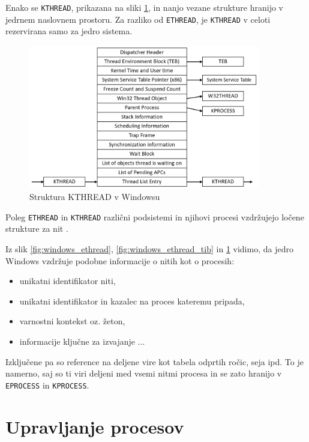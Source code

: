 \documentclass[a4paper,12pt,openright]{book}
\begin{document}
Enako se \texttt{KTHREAD}, prikazana na sliki \ref{fig:windows_kthread}, in nanjo vezane strukture hranijo v jedrnem naslovnem prostoru.
Za razliko od \texttt{ETHREAD}, je \texttt{KTHREAD} v celoti rezervirana samo za jedro sistema.

\begin{figure}[h!]
	\begin{center}
		\includegraphics[width=0.9\textwidth]{images/windows_kthread.png}
	\end{center}
	\caption{Struktura KTHREAD v Windowsu \cite{Yosifovich_Russinovich_Solomon_Ionescu_2017}}
	\label{fig:windows_kthread}
\end{figure}

Poleg \texttt{ETHREAD} in \texttt{KTHREAD} različni podsistemi in njihovi procesi vzdržujejo ločene strukture za nit \cite{Yosifovich_Russinovich_Solomon_Ionescu_2017}.

Iz slik \ref{fig:windows_ethread}, \ref{fig:windows_ethread_tib} in \ref{fig:windows_kthread} vidimo, da jedro Windows vzdržuje podobne informacije o nitih kot o procesih:
\begin{itemize}
	\item unikatni identifikator niti,
	\item unikatni identifikator in kazalec na proces kateremu pripada,
	\item varnostni kontekst oz. žeton,
	\item informacije ključne za izvajanje ...
\end{itemize}
Izključene pa so reference na deljene vire kot tabela odprtih ročic, seja ipd.
To je namerno, saj so ti viri deljeni med vsemi nitmi procesa in se zato hranijo v \texttt{EPROCESS} in \texttt{KPROCESS}.

\chapter{Upravljanje procesov}
\end{document}
